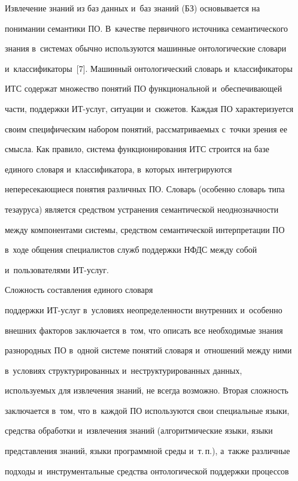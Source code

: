   Извлечение знаний из баз данных и~баз знаний (БЗ) основывается на


понимании семантики ПО. В~качестве первичного источника семантического


знания в~системах обычно используются машинные онтологические словари


и~классификаторы~[7]. Машинный онтологический словарь и~классификаторы


ИТС содержат множество понятий ПО функциональной и~обеспечивающей


части, поддержки ИТ-услуг, ситуации и~сюжетов. Каждая ПО характеризуется


своим специфическим набором понятий, рассматриваемых с~точки зрения ее


смысла. Как правило, система функционирования ИТС строится на базе


единого словаря и~классификатора, в~которых интегрируются


непересекающиеся понятия различных ПО. Словарь (особенно словарь типа


тезауруса) является средством устранения семантической неоднозначности


между компонентами системы, средством семантической интерпретации ПО


в~ходе общения специалистов служб поддержки НФДС между собой


и~пользователями ИТ-услуг. 





Сложность составления единого словаря


поддержки ИТ-услуг в~условиях неопределенности внутренних и~особенно


внешних факторов заключается в~том, что описать все необходимые знания


разнородных ПО в~одной системе понятий словаря и~отношений между ними


в~условиях структурированных и~неструктурированных данных,


используемых для извлечения знаний, не всегда возможно. Вторая сложность


заключается в~том, что в~каж\-дой ПО используются свои специальные языки,


средства обработки и~извлечения знаний (алгоритмические языки, языки


представления знаний, языки программной среды и~т.\,п.), а~так\-же различные


подходы и~инструментальные средства онтологической поддержки процессов


